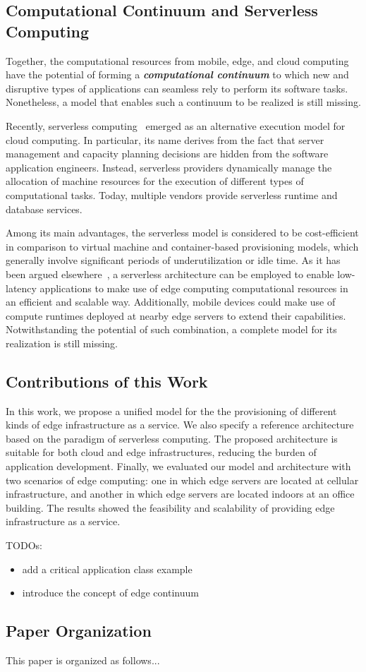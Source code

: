 \subsection{Computational Continuum and Serverless Computing}

Together, the computational resources from mobile, edge, and cloud computing have the potential of forming a \textit{\textbf{computational continuum}} to which new and disruptive types of applications can seamless rely to perform its software tasks. Nonetheless, a model that enables such a continuum to be realized is still missing.

Recently, serverless computing~\cite{} emerged as an alternative execution model for cloud computing. In particular, its name derives from the fact that server management and capacity planning decisions are hidden from the software application engineers. Instead, serverless providers dynamically manage the allocation of machine resources for the execution of different types of computational tasks. Today, multiple vendors provide serverless runtime and database services. 

Among its main advantages, the serverless model is considered to be cost-efficient in comparison to virtual machine and container-based provisioning models, which generally involve significant periods of underutilization or idle time. As it has been argued elsewhere~\cite{ESOCC'17}, a serverless architecture can be employed to enable low-latency applications to make use of edge computing computational resources in an efficient and scalable way. Additionally, mobile devices could make use of compute runtimes deployed at nearby edge servers to extend their capabilities. Notwithstanding the potential of such combination, a complete model for its realization is still missing. 

\subsection{Contributions of this Work}

In this work, we propose a unified model for the the provisioning of different kinds of edge infrastructure as a service. We also specify a reference architecture based on the paradigm of serverless computing. The proposed architecture is suitable for both cloud and edge infrastructures, reducing the burden of application development. Finally, we evaluated our model and architecture with two scenarios of edge computing: one in which edge servers are located at cellular infrastructure, and another in which edge servers are located indoors at an office building. The results showed the feasibility and scalability of providing edge infrastructure as a service.

TODOs: 
\begin{itemize}

\item add a critical application class example
\item introduce the concept of edge continuum

\end{itemize}

\subsection{Paper Organization}

This paper is organized as follows...





